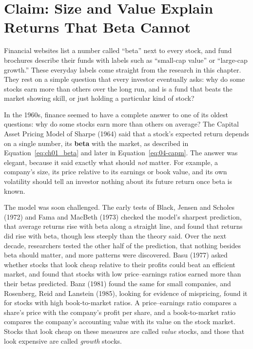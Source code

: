 \makeatletter
{}
\makeatother

\chapter{Claim: Size and Value Explain Returns That Beta Cannot}
\label{ch:03}

Financial websites list a number called ``beta'' next to every stock, and fund brochures describe their funds with labels such as ``small-cap value'' or ``large-cap growth.'' These everyday labels come straight from the research in this chapter. They rest on a simple question that every investor eventually asks: why do some stocks earn more than others over the long run, and is a fund that beats the market showing skill, or just holding a particular kind of stock?

In the 1960s, finance seemed to have a complete answer to one of its oldest questions: why do some stocks earn more than others on average? The Capital Asset Pricing Model of Sharpe (1964) said that a stock's expected return depends on a single number, its \textbf{beta} with the market, as described in Equation~\ref{eq:ch01_beta} and later in Equation~\ref{eq:04-capm}. The answer was elegant, because it said exactly what should \emph{not} matter. For example, a company's size, its price relative to its earnings or book value, and its own volatility should tell an investor nothing about its future return once beta is known.

The model was soon challenged. The early tests of Black, Jensen and Scholes (1972) and Fama and MacBeth (1973) checked the model's sharpest prediction, that average returns rise with beta along a straight line, and found that returns did rise with beta, though less steeply than the theory said. Over the next decade, researchers tested the other half of the prediction, that nothing besides beta should matter, and more patterns were discovered.
Basu (1977) asked whether stocks that look cheap relative to their profits could beat an efficient market, and found that stocks with low price--earnings ratios earned more than their betas predicted. Banz (1981) found the same for small companies, and Rosenberg, Reid and Lanstein (1985), looking for evidence of mispricing, found it for stocks with high book-to-market ratios. A price--earnings ratio compares a share's price with the company's profit per share, and a book-to-market ratio compares the company's accounting value with its value on the stock market. Stocks that look cheap on these measures are called \emph{value} stocks, and those that look expensive are called \emph{growth} stocks.

